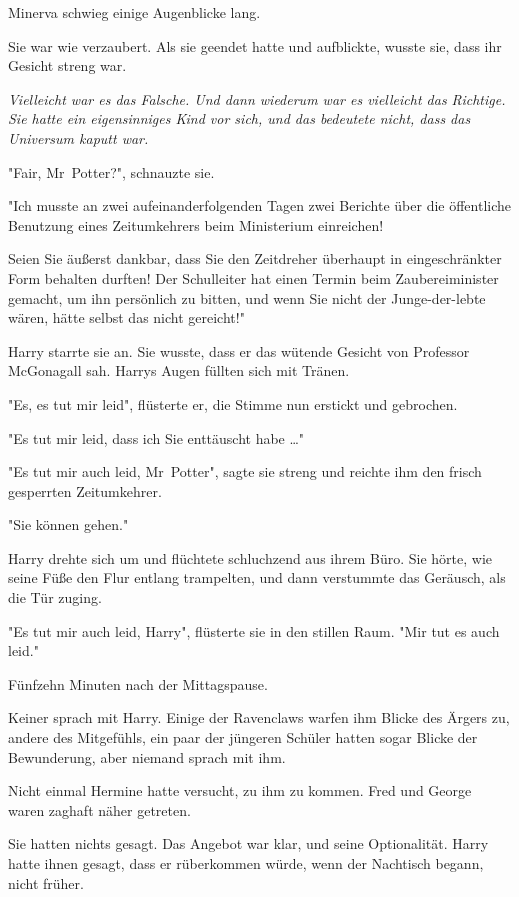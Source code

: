 {Minerva schwieg einige Augenblicke lang.

Sie war wie verzaubert. Als sie geendet hatte und aufblickte, wusste sie, dass ihr Gesicht streng war.

\emph{Vielleicht war es das Falsche. Und dann wiederum war es vielleicht das Richtige. Sie hatte ein eigensinniges Kind vor sich, und das bedeutete nicht, dass das Universum kaputt war.}

"Fair, Mr~Potter?", schnauzte sie.

"Ich musste an zwei aufeinanderfolgenden Tagen zwei Berichte über die öffentliche Benutzung eines Zeitumkehrers beim Ministerium einreichen!

Seien Sie äußerst dankbar, dass Sie den Zeitdreher überhaupt in eingeschränkter Form behalten durften! Der Schulleiter hat einen Termin beim Zaubereiminister gemacht, um ihn persönlich zu bitten, und wenn Sie nicht der Junge-der-lebte wären, hätte selbst das nicht gereicht!"

Harry starrte sie an. Sie wusste, dass er das wütende Gesicht von Professor McGonagall sah. Harrys Augen füllten sich mit Tränen.

"Es, es tut mir leid", flüsterte er, die Stimme nun erstickt und gebrochen.

"Es tut mir leid, dass ich Sie enttäuscht habe …"

"Es tut mir auch leid, Mr~Potter", sagte sie streng und reichte ihm den frisch gesperrten Zeitumkehrer.

"Sie können gehen."

Harry drehte sich um und flüchtete schluchzend aus ihrem Büro. Sie hörte, wie seine Füße den Flur entlang trampelten, und dann verstummte das Geräusch, als die Tür zuging.

"Es tut mir auch leid, Harry", flüsterte sie in den stillen Raum. "Mir tut es auch leid."

Fünfzehn Minuten nach der Mittagspause.

Keiner sprach mit Harry. Einige der Ravenclaws warfen ihm Blicke des Ärgers zu, andere des Mitgefühls, ein paar der jüngeren Schüler hatten sogar Blicke der Bewunderung, aber niemand sprach mit ihm.

Nicht einmal Hermine hatte versucht, zu ihm zu kommen. Fred und George waren zaghaft näher getreten.

Sie hatten nichts gesagt. Das Angebot war klar, und seine Optionalität. Harry hatte ihnen gesagt, dass er rüberkommen würde, wenn der Nachtisch begann, nicht früher.

}
